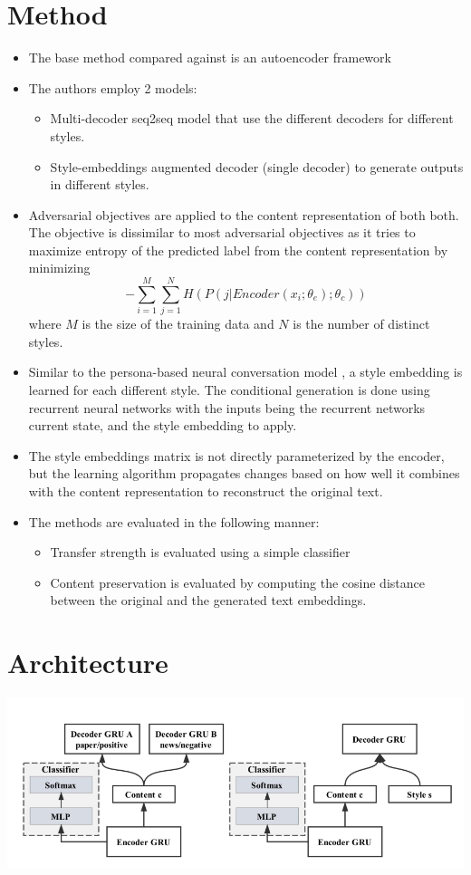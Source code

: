 \documentclass[12pt]{article}
\begin{document}
\section{Method}
  \begin{itemize}
    \item The base method compared against is an autoencoder framework
    \item The authors employ 2 models:
    \begin{itemize}
      \item Multi-decoder seq2seq model \cite{sutskever2014sequence} that use the different decoders for different styles.
      \item Style-embeddings augmented decoder (single decoder) to generate outputs in different styles.
    \end{itemize}
    \item Adversarial objectives are applied to the content representation of both both. The objective is dissimilar to most adversarial objectives as it tries to maximize entropy of the predicted label from the content representation by minimizing $$-\sum_{i=1}^M\sum_{j=1}^N H(P(j|Encoder(x_i; \theta_e); \theta_c))$$ where $M$ is the size of the training data and $N$ is the number of distinct styles.
    \item Similar to the persona-based neural conversation model \cite{li2016persona}, a style embedding is learned for each different style. The conditional generation is done using recurrent neural networks with the inputs being the recurrent networks current state, and the style embedding to apply.
    \item The style embeddings matrix is not directly parameterized by the encoder, but the learning algorithm propagates changes based on how well it combines with the content representation to reconstruct the original text.
    \item The methods are evaluated in the following manner:
    \begin{itemize}
      \item Transfer strength is evaluated using a simple classifier
      \item Content preservation is evaluated by computing the cosine distance between the original and the generated text embeddings.
    \end{itemize}
  \end{itemize}

\section{Architecture}
  \includegraphics[width=\textwidth]{architecture}
\end{document}
